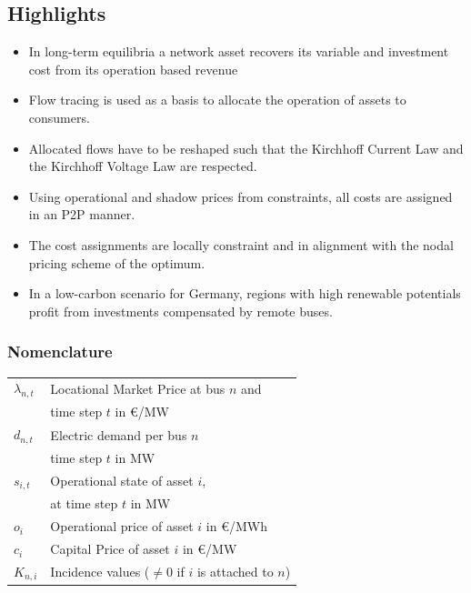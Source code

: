 \documentclass[11pt,twocolumn]{article}
\newcommand{\vpad}{\vspace{1mm}}
\newcommand{\state}[1][i]{s_{#1,t}}
\newcommand{\generation}{g_{s,t}}
\newcommand{\capacitygeneration}{G_{s}}
\newcommand{\flow}{f_{\ell,t}}
\newcommand{\capacityflow}{F_{\ell}}
\newcommand{\lmp}[1][n]{\lambda_{#1,t}}
\newcommand{\demand}[1][n]{d_{#1,t}}
\newcommand{\incidenceasset}[1][n]{K_{#1,i}}
\begin{document}
\subsection*{Highlights}
\begin{itemize}
    \item In long-term equilibria a network asset recovers its variable and investment cost from its operation based revenue
    \item Flow tracing is used as a basis to allocate the operation of assets to consumers. 
    \item Allocated flows have to be reshaped such that the Kirchhoff Current Law and the Kirchhoff Voltage Law are respected. 
    \item Using operational and shadow prices from constraints, all costs are assigned in an P2P manner.
    \item The cost assignments are locally constraint and in alignment with the nodal pricing scheme of the optimum.    
    \item In a low-carbon scenario for Germany, regions with high renewable potentials profit from investments compensated by remote buses.   
\end{itemize}


\subsubsection*{Nomenclature}

\begin{table}[h]
    \centering
    \begin{tabular}{ll}
        $\lmp$ & Locational Market Price at bus $n$ and  \\ & time step $t$ in \euro/MW \vpad \\
        $\demand$ & Electric demand per bus $n$ \\ & time step $t$ in MW  \vpad \\
        $\state$ & Operational state of asset $i$, \\ & at time step $t$  in MW \vpad \\
        $o_i$ & Operational price of asset $i$ in \euro/MWh \vpad \\
        $c_i$ & Capital Price of asset $i$ in \euro/MW \vpad \\
        $\incidenceasset$ & Incidence values ($\ne$0  if $i$ is attached to $n$)  \vpad 
    \end{tabular}
\end{table}
\end{document}
